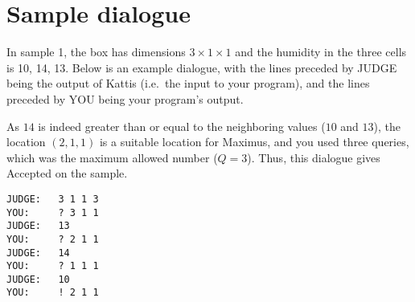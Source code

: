 \section*{Sample dialogue}
In sample 1, the box has dimensions $3\times 1\times 1$ and the humidity in the three cells is {10, 14, 13}. Below is an example dialogue, with the lines preceded by JUDGE being the output of Kattis (i.e.\ the input to your program), and the lines preceded by YOU being your program's output.

As $14$ is indeed greater than or equal to the neighboring values ($10$ and $13$), the location $(2,1,1)$ is a suitable location for Maximus, and you used three queries, which was the maximum allowed number ($Q=3$). Thus, this dialogue gives Accepted on the sample.

\begin{verbatim}
JUDGE:   3 1 1 3
YOU:     ? 3 1 1
JUDGE:   13
YOU:     ? 2 1 1
JUDGE:   14
YOU:     ? 1 1 1
JUDGE:   10
YOU:     ! 2 1 1
\end{verbatim}
